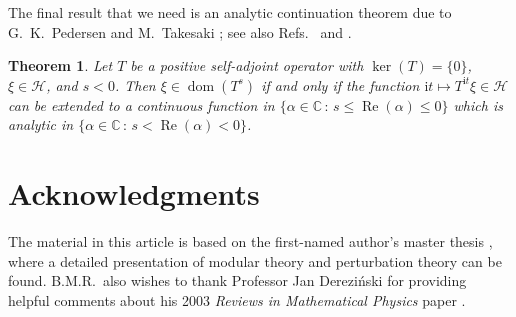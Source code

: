 \documentclass[a4paper, twoside, 11pt, reqno]{amsart}
\theoremstyle{definition}
\theoremstyle{plain}
\newtheorem{theorem}[definition]{Theorem}
\renewcommand{\Re}{\operatorname{Re}}
\newcommand{\C}{\mathbb{C}}
\newcommand{\MH}{\mathcal{H}}
\newcommand{\ii}{\mathrm{i}}
\newcommand{\1}{\mathbf{1}}
\DeclareMathOperator{\dom}{dom}
\newcommand{\set}[2][]{#1\{{#2}#1\}}
\begin{document}
The final result that we need is an analytic continuation theorem due to G.~K.~Pedersen and M.~Takesaki \cite[Lem. 3.2]{Pedersen1973}; see also Refs.~\cite[Lem. 3]{Araki1973b} and \cite[Cor. 9.21]{StratilaZsido2019}.

\begin{theorem}\label{thm:analyticCont}
    Let $T$ be a positive self-adjoint operator with $\ker(T) = \set{0}$, $\xi \in \MH$, and $s < 0$. Then $\xi \in \dom(T^s)$ if and only if the function $\ii t \mapsto T^{\ii t} \xi \in \MH$ can be extended to a continuous function in $\set{\alpha \in \C \, : \, s \le \Re(\alpha) \le 0}$ which is analytic in $\set{\alpha \in \C \, : \, s < \Re(\alpha) < 0}$.
\end{theorem}



\section*{Acknowledgments}

The material in this article is based on the first-named author's master thesis \cite{Reible2025mt}, where a detailed presentation of modular theory and perturbation theory can be found. B.M.R.~also wishes to thank Professor Jan Derezi\'{n}ski for providing helpful comments about his 2003 \emph{Reviews in Mathematical Physics} paper \cite{DJP03}.



\end{document}
